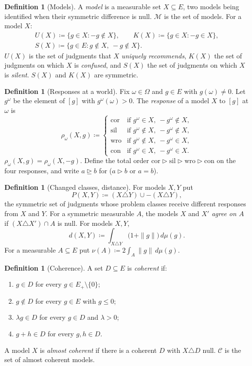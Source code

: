 \documentclass[11pt]{article}
\theoremstyle{definition}
\newtheorem{definition}[theorem]{Definition}
\newcommand{\M}{\mathcal M}
\newcommand{\C}{\mathcal C}
\newcommand{\cor}{\mathrm{cor}}
\newcommand{\sil}{\mathrm{sil}}
\newcommand{\wro}{\mathrm{wro}}
\newcommand{\con}{\mathrm{con}}
\begin{document}
\begin{definition}[Models]\label{def:models}
A \emph{model} is a measurable set $X\subseteq E$, two models being identified when their symmetric difference is null. $\M$ is the set of models. For a model $X$:
\begin{gather*}
U(X)\coloneqq\{g\in X:-g\notin X\},\qquad K(X)\coloneqq\{g\in X:-g\in X\},\\
S(X)\coloneqq\{g\in E:g\notin X,\ -g\notin X\}.
\end{gather*}
$U(X)$ is the set of judgments that $X$ \emph{uniquely recommends}, $K(X)$ the set of judgments on which $X$ is \emph{confused}, and $S(X)$ the set of judgments on which $X$ is \emph{silent}. $S(X)$ and $K(X)$ are symmetric.
\end{definition}

\begin{definition}[Responses at a world]\label{def:responses}
Fix $\omega\in\Omega$ and $g\in E$ with $g(\omega)\ne0$. Let $g^\omega$ be the element of $[g]$ with $g^\omega(\omega)>0$. The \emph{response} of a model $X$ to $[g]$ at $\omega$ is
\[
\rho_\omega(X,g)\coloneqq
\begin{cases}
\cor &\text{if } g^\omega\in X,\ -g^\omega\notin X,\\
\sil &\text{if } g^\omega\notin X,\ -g^\omega\notin X,\\
\wro &\text{if } g^\omega\notin X,\ -g^\omega\in X,\\
\con &\text{if } g^\omega\in X,\ -g^\omega\in X.
\end{cases}
\]
$\rho_\omega(X,g)=\rho_\omega(X,-g)$. Define the total order $\cor\rhd\sil\rhd\wro\rhd\con$ on the four responses, and write $a\unrhd b$ for ($a\rhd b$ or $a=b$).
\end{definition}

\begin{definition}[Changed classes, distance]\label{def:changed}
For models $X,Y$ put
\[
P(X,Y)\coloneqq (X\triangle Y)\cup -(X\triangle Y),
\]
the symmetric set of judgments whose problem classes receive different responses from $X$ and $Y$. For a symmetric measurable $A$, the models $X$ and $X'$ \emph{agree on $A$} if $(X\triangle X')\cap A$ is null. For models $X,Y$,
\[
d(X,Y)\coloneqq\int_{X\triangle Y}\bigl(1+\|g\|\bigr)\,d\mu(g).
\]
For a measurable $A\subseteq E$ put $\nu(A)\coloneqq2\int_A\|g\|\,d\mu(g)$.
\end{definition}

\begin{definition}[Coherence]\label{def:coherence}
A set $D\subseteq E$ is \emph{coherent} if:
\begin{enumerate}[label=(C\arabic*)]
\item $g\in D$ for every $g\in E_+\setminus\{0\}$;
\item $g\notin D$ for every $g\in E$ with $g\le0$;
\item $\lambda g\in D$ for every $g\in D$ and $\lambda>0$;
\item $g+h\in D$ for every $g,h\in D$.
\end{enumerate}
A model $X$ is \emph{almost coherent} if there is a coherent $D$ with $X\triangle D$ null. $\C$ is the set of almost coherent models.
\end{definition}
\end{document}
